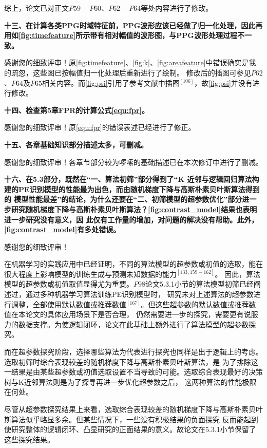 综上，论文已对正文$P59-P60$、$P62-P64$等处内容进行了修改。

\textbf{十三、在计算各类PPG时域特征前，PPG波形应该已经做了归一化处理，因此再用如\autoref{fig:timefeature}所示带有相对幅值的波形图，与PPG波形处理过程不一致。}

感谢您的细致评审！原\autoref{fig:timefeature}、\autoref{fig:k}、\autoref{fig:areafeature}中错误确实是我的疏忽，这些图已按幅值归一化处理后重新进行了绘制。
修改后的插图可参见$P62$、$P64$及$P65$相关内容。而\autoref{fig:psi}引用了参考文献中插图$^{[106]}$，故\autoref{fig:psi}并没有进行修改。

\textbf{十四、检查第5章FPR的计算公式\autoref{equ:fpr}。}

感谢您的细致评审！原\autoref{equ:fpr}的错误表述已经进行了修正。

\textbf{十五、各章基础知识部分描述太多，可删减。}

感谢您的细致评审！各章节部分较为啰嗦的基础描述已在本次修订中进行了删减。

\textbf{十六、在5.3部分，既然在“一、算法初筛”部分得到了“K 近邻与逻辑回归算法构建的PE识别模型的性能最为出色，而由随机梯度下降与高斯朴素贝叶斯算法得到的
模型性能最差”的结论，为什么还要在“二、初筛模型的超参数优化”部分进一步研究随机梯度下降与高斯朴素贝叶斯算法？\autoref{fig:contrast_model}结果也表明进一步研究没有意义，因
此仅有工作量的增加，对问题的解决没有帮助。此外，\autoref{fig:contrast_model}有多处错误。}

感谢您的细致评审！

在机器学习的实践应用中已经证明，不同的算法模型的超参数或初值的选取，能在很大程度上影响模型的训练生成与预测未知数据的能力$^{[133,159-162]}$。
因此，算法模型的超参数或初值取值显得尤为重要。$P98$论文5.3.1小节的算法模型初筛已经阐述过，通过多种机器学习算法训练PE识别模型时，
研究未对上述算法的超参数进行调整，全部使用默认数值或推荐数值$^{[167]}$。但这些超参数的默认数值或推荐数值在本论文的具体应用场景下是否合理，
仍然需要进一步的探究，需要更有说服力的数据支撑。为使逻辑闭环，论文在此基础上额外进行了算法模型的超参数探究。

而在超参数探究阶段，选择哪些算法为代表进行探究也同样是出于逻辑上的考虑。选取初筛时综合表现较差的随机梯度下降与高斯朴素贝叶斯算法，是
为了排除这一结果是由某些超参数或初值选取设置不当导致的可能。选取综合表现最好的决策树与K近邻算法则是为了探寻再进一步优化超参数之后，
这两种算法的性能极限在何处。

尽管从超参数探究结果上来看，选取综合表现较差的随机梯度下降与高斯朴素贝叶斯算法似乎略显多余。但某些情况下，一些没有积极结果的负面探究
反而能起到使研究整体的逻辑闭环、凸显研究的正面结果的意义。故论文在5.3.1小节保留了这些探究结果。

